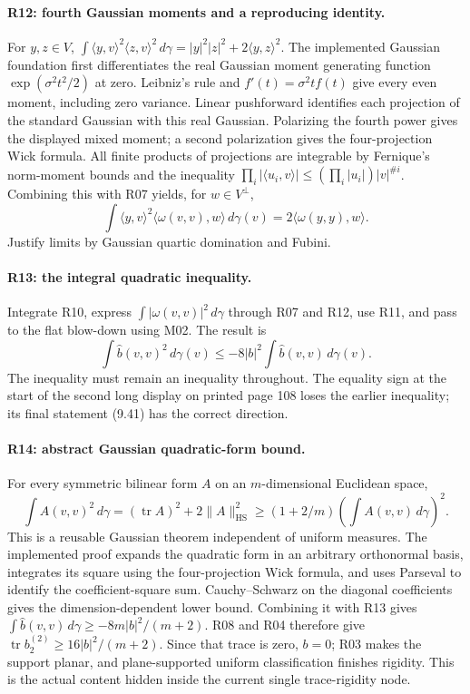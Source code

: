 \paragraph{R12: fourth Gaussian moments and a reproducing identity.}
For $y,z\in V$,
$\int\langle y,v\rangle^2\langle z,v\rangle^2\,d\gamma
=|y|^2|z|^2+2\langle y,z\rangle^2$.
The implemented Gaussian foundation first differentiates the real Gaussian
moment generating function $\exp(\sigma^2t^2/2)$ at zero. Leibniz's rule and
$f'(t)=\sigma^2tf(t)$ give every even moment, including zero variance.
Linear pushforward identifies each projection of the standard Gaussian with
this real Gaussian. Polarizing the fourth power gives the displayed mixed
moment; a second polarization gives the four-projection Wick formula.
All finite products of projections are integrable by Fernique's norm-moment
bounds and the inequality
$\prod_i|\langle u_i,v\rangle|\leq(\prod_i|u_i|)|v|^{\#i}$.
Combining this with R07 yields, for $w\in V^\perp$,
\[
 \int\langle y,v\rangle^2\langle\omega(v,v),w\rangle\,d\gamma(v)
 =2\langle\omega(y,y),w\rangle.
\]
Justify limits by Gaussian quartic domination and Fubini.

\paragraph{R13: the integral quadratic inequality.}
Integrate R10, express $\int|\omega(v,v)|^2\,d\gamma$ through R07 and R12,
use R11, and pass to the flat blow-down using M02. The result is
\[
 \int\widehat b(v,v)^2\,d\gamma(v)
 \leq-8|b|^2\int\widehat b(v,v)\,d\gamma(v).
\]
The inequality must remain an inequality throughout. The equality sign at
the start of the second long display on printed page 108 loses the earlier
inequality; its final statement (9.41) has the correct direction.

\paragraph{R14: abstract Gaussian quadratic-form bound.}
For every symmetric bilinear form $A$ on an $m$-dimensional Euclidean space,
\[
 \int A(v,v)^2\,d\gamma=(\operatorname{tr}A)^2+
 2\|A\|_{\mathrm{HS}}^2
 \geq(1+2/m)\left(\int A(v,v)\,d\gamma\right)^2.
\]
This is a reusable Gaussian theorem independent of uniform measures.
The implemented proof expands the quadratic form in an arbitrary orthonormal
basis, integrates its square using the four-projection Wick formula, and
uses Parseval to identify the coefficient-square sum. Cauchy--Schwarz
on the diagonal coefficients gives the dimension-dependent lower bound.
Combining it with R13 gives
$\int\widehat b(v,v)\,d\gamma\geq-8m|b|^2/(m+2)$.
R08 and R04 therefore give
$\operatorname{tr}b_2^{(2)}\geq16|b|^2/(m+2)$.
Since that trace is zero, $b=0$; R03 makes the support planar, and plane-supported
uniform classification finishes rigidity. This is the actual content hidden
inside the current single trace-rigidity node.

